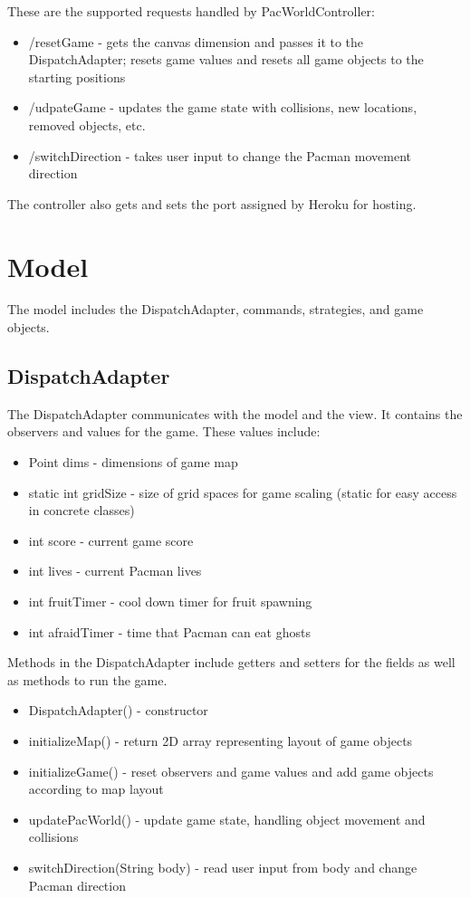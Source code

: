 \documentclass[letterpaper, 11pt]{article}
\begin{document}
These are the supported requests handled by PacWorldController:
\begin{itemize}
  \item /resetGame - gets the canvas dimension and passes it to the DispatchAdapter; resets game values and resets all game objects to the starting positions
  \item /udpateGame - updates the game state with collisions, new locations, removed objects, etc.
  \item /switchDirection - takes user input to change the Pacman movement direction
\end{itemize}

The controller also gets and sets the port assigned by Heroku for hosting.

\section{Model}
The model includes the DispatchAdapter, commands, strategies, and game objects.

\subsection{DispatchAdapter}
The DispatchAdapter communicates with the model and the view. It contains the observers and values for the game. These values include:
\begin{itemize}
  \item Point dims - dimensions of game map
  \item static int gridSize - size of grid spaces for game scaling (static for easy access in concrete classes)
  \item int score - current game score
  \item int lives - current Pacman lives
  \item int fruitTimer - cool down timer for fruit spawning
  \item int afraidTimer - time that Pacman can eat ghosts 
\end{itemize}

Methods in the DispatchAdapter include getters and setters for the fields as well as methods to run the game.
\begin{itemize}
  \item DispatchAdapter() - constructor
  \item initializeMap() - return 2D array representing layout of game objects
  \item initializeGame() - reset observers and game values and add game objects according to map layout
  \item updatePacWorld() - update game state, handling object movement and collisions
  \item switchDirection(String body) - read user input from body and change Pacman direction
 \end{itemize}
 
\end{document}
